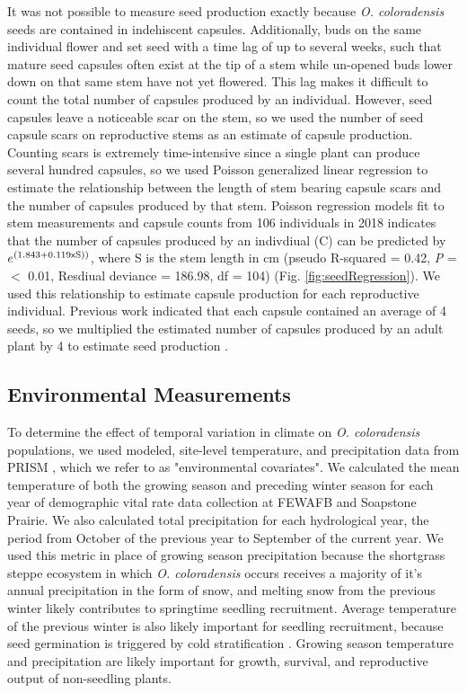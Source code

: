 \documentclass[12pt, letterpaper]{article}
\begin{document}
It was not possible to measure seed production exactly because \textit{O. coloradensis} seeds are contained in indehiscent capsules. Additionally, buds on the same individual flower and set seed with a time lag of up to several weeks, such that mature seed capsules often exist at the tip of a stem while un-opened buds lower down on that same stem have not yet flowered. This lag makes it difficult to count the total number of capsules produced by an individual. However, seed capsules leave a noticeable scar on the stem, so we used the number of seed capsule scars on reproductive stems as an estimate of capsule production. Counting scars is extremely time-intensive since a single plant can produce several hundred capsules, so we used Poisson generalized linear regression to estimate the relationship between the length of stem bearing capsule scars and the number of capsules produced by that stem. Poisson regression models fit to stem measurements and capsule counts from 106 individuals in 2018 indicates that the number of capsules produced by an indivdiual (C) can be predicted by $e^{(1.843 + 0.119\text{\textsf{x}}\text{S}))}$, where S is the stem length in cm (pseudo R-squared = 0.42, \textit{P} = $<$ 0.01, Resdiual deviance = 186.98, df = 104) (Fig. \ref{fig:seedRegression}). We used this relationship to estimate capsule production for each reproductive individual. Previous work indicated that each capsule contained an average of 4 seeds, so we multiplied the estimated number of capsules produced by an adult plant by 4 to estimate seed production \cite{Burgess2005CapsuleColoradensis}. 

\subsection{Environmental Measurements}
To determine the effect of temporal variation in climate on \textit{O. coloradensis} populations, we used modeled, site-level temperature, and precipitation data from PRISM \cite{PRISMClimateGroupOregonStateUniversity2021PRISMUniversity}, which we refer to as "environmental covariates". We calculated the mean temperature of both the growing season and preceding winter season for each year of demographic vital rate data collection at FEWAFB and Soapstone Prairie. We also calculated total precipitation for each hydrological year, the period from October of the previous year to September of the current year. We used this metric in place of growing season precipitation because the shortgrass steppe ecosystem in which \textit{O. coloradensis} occurs receives a majority of it's annual precipitation in the form of snow, and melting snow from the previous winter likely contributes to springtime seedling recruitment. Average temperature of the previous winter is also likely important for seedling recruitment, because seed germination is triggered by cold stratification \cite{Burgess2005CapsuleColoradensis}. Growing season temperature and precipitation are likely important for growth, survival, and reproductive output of non-seedling plants. 
\end{document}
